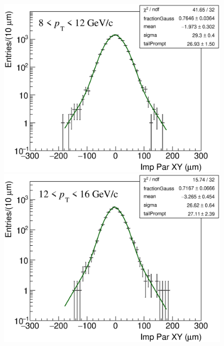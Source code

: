 \documentclass[b5paper,10pt,twoside,oldstyle,classica]{toptesi}
\begin{document}
\begin{figure}[h]
\begin{center}
\hspace{0cm}
{\includegraphics[scale = 0.24]{ImpParPrompt_8-12.eps}}
\vspace{0cm}
{\includegraphics[scale = 0.24]{ImpParPrompt_12-16.eps}}
\end{center}
\end{figure}
\clearpage
\end{document}
